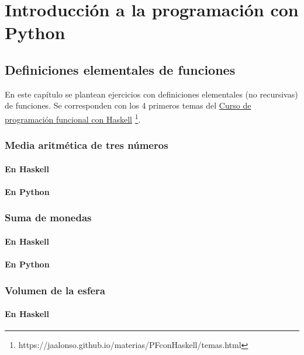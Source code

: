 \documentclass[a4paper,12pt,twoside]{book}
\begin{document}
\part{Introducción a la programación con Python}

\chapter{Definiciones elementales de funciones}

En este capítulo se plantean ejercicios con definiciones elementales (no
recursivas) de funciones. Se corresponden con los 4 primeros temas del
\href{https://jaalonso.github.io/materias/PFconHaskell/temas.html}
{Curso de programación funcional con Haskell}
\footnote{https://jaalonso.github.io/materias/PFconHaskell/temas.html}.

\minitoc

\section{Media aritmética de tres números}
\subsection*{En Haskell}
\subsection*{En Python}

\section{Suma de monedas}
\subsection*{En Haskell}
\subsection*{En Python}

\section{Volumen de la esfera}
\subsection*{En Haskell}
\end{document}
